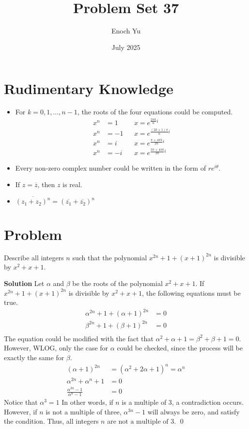\documentclass{article}
\title{Problem Set 37}
\author{Enoch Yu}
\date{July 2025}
\newenvironment{solution}{\begin{trivlist}\item[]{\bf Solution}}{\qed \end{trivlist}}
\begin{document}
\section*{Rudimentary Knowledge}
\begin{itemize}
    \item For $k = 0, 1, \dots, n-1$, the roots of the four equations could be computed.
        \begin{align*}
           x^n &= 1 &&x = e^{\frac{2\pi k}{n}i} \\
           x^n &= -1 &&x = e^{\frac{(2k + 1)\pi}{n}i} \\
           x^n &= i &&x = e^{\frac{\pi + 4\pi k}{2n} i} \\
           x^n &= -i &&x = e^{\frac{3\pi + 4\pi k}{2n}i}
        \end{align*}
    \item Every non-zero complex number could be written in the form of $r e^{i\theta}$.
    \item If $z = \overline{z}$, then $z$ is real.
    \item $\overline{(z_1 + z_2)^n} = \left( \overline{z_1} + \overline{z_2} \right)^n$
\end{itemize}

\section*{Problem}
Describe all integers $n$ such that the polynomial $x^{2n} + 1 + (x + 1)^{2n}$ is divisible by $x^2 + x + 1$.
\begin{solution}
Let $\alpha$ and $\beta$ be the roots of the polynomial $x^2 + x + 1$. If $x^{2n} + 1 + (x + 1)^{2n}$ is divisible by $x^2 + x + 1$, the following equations must be true.
\begin{align*}
    \alpha^{2n} + 1 + (\alpha + 1)^{2n} &= 0 \\
    \beta^{2n} + 1 + (\beta + 1)^{2n} &= 0 \\
\end{align*}
The equation could be modified with the fact that $\alpha^2 + \alpha + 1 = \beta^2 + \beta + 1 = 0$. However, WLOG, only the case for $\alpha$ could be checked, since the process will be exactly the same for $\beta$.
\begin{align*}
    (\alpha + 1)^{2n} &= \left( \alpha^2 + 2\alpha + 1 \right)^n = \alpha^n \\
    \alpha^{2n} + \alpha^n + 1 &= 0 \\
    \frac{\alpha^{3n} - 1}{\alpha^n - 1} &= 0
\end{align*}
Notice that $\alpha^3 = 1$ In other words, if $n$ is a multiple of $3$, a contradiction occurs. However, if $n$ is not a multiple of three, $\alpha^{3n} - 1$ will always be zero, and satisfy the condition. Thus, all integers $n$ are $\boxed{\text{not a multiple of $3$}}$. 
\end{solution}
\end{document}
